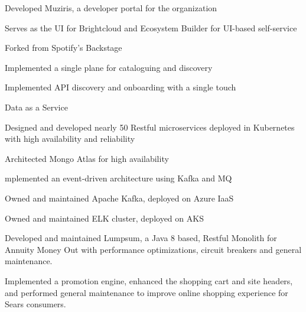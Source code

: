 \documentclass[]{de-resume}
\begin{document}
\begin{minipage}[t]{0.66\textwidth}
\begin{tightemize}
\item Developed Muziris, a developer portal for the organization
\begin{tightemize}
	\sectionsep
	\item Serves as the UI for Brightcloud and Ecosystem Builder for UI-based self-service
	\item Forked from Spotify's Backstage
	\item Implemented a single plane for cataloguing and discovery 
	\item Implemented API discovery and onboarding with a single touch
	\sectionsep
\end{tightemize}

\end{tightemize}
\sectionsep
{}
\begin{tightemize}
\item Data as a Service
	\sectionsep
	\begin{tightemize}
	\item Designed and developed nearly 50 Restful microservices deployed in Kubernetes with high availability and reliability
	\item Architected Mongo Atlas for high availability 
	\item mplemented an event-driven architecture using Kafka and MQ
	\item Owned and maintained Apache Kafka, deployed on Azure IaaS
	\item Owned and maintained ELK cluster, deployed on AKS
	\end{tightemize}
	\sectionsep
\end{tightemize}
\subsectionsep


\subsectionsep
{}
\subsectionsep
\begin{tightemize}
\item Developed and maintained Lumpsum, a Java 8 based, Restful Monolith for Annuity Money Out with performance optimizations, circuit breakers and general maintenance.
\end{tightemize}


\subsectionsep
{}
\subsectionsep
\begin{tightemize}
\item Implemented a promotion engine, enhanced the shopping cart and site headers, and performed general maintenance to improve online shopping experience for Sears consumers.
\end{tightemize}

\end{minipage} 
\end{document}
